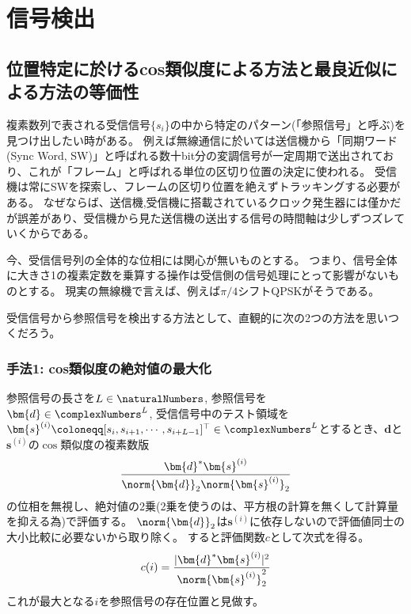 \chapter{信号検出}
    \section{位置特定に於けるcos類似度による方法と最良近似による方法の等価性}
        複素数列で表される受信信号$\{s_i\}$の中から特定のパターン(「参照信号」と呼ぶ)を見つけ出したい時がある。
        例えば無線通信に於いては送信機から「同期ワード (Sync Word, SW)」と呼ばれる数十bit分の変調信号が一定周期で送出されており、これが「フレーム」と呼ばれる単位の区切り位置の決定に使われる。
        受信機は常にSWを探索し、フレームの区切り位置を絶えずトラッキングする必要がある。
        なぜならば、送信機,受信機に搭載されているクロック発生器には僅かだが誤差があり、受信機から見た送信機の送出する信号の時間軸は少しずつズレていくからである。
        \par
        今、受信信号列の全体的な位相には関心が無いものとする。
        つまり、信号全体に大きさ1の複素定数を乗算する操作は受信側の信号処理にとって影響がないものとする。
        現実の無線機で言えば、例えば$\pi/4$シフトQPSKがそうである。
        \par
        受信信号から参照信号を検出する方法として、直観的に次の2つの方法を思いつくだろう。
        \subsection{手法1: cos類似度の絶対値の最大化}
            \label{手法1: cos類似度の絶対値の最大化}
            参照信号の長さを$L\in\naturalNumbers$, 参照信号を$\bm{d} \in \complexNumbers^L$, 受信信号中のテスト領域を$\bm{s}^{(i)} \coloneqq [s_i,s_{i+1},\cdots,s_{i+L-1}]^\top \in \complexNumbers^L$とするとき、$\bm{d}$と$\bm{s}^{(i)}$の$\cos$類似度の複素数版
            \[ \frac{\bm{d}^*\bm{s}^{(i)}}{\norm{\bm{d}}_2\norm{\bm{s}^{(i)}}_2} \]
            の位相を無視し、絶対値の2乗(2乗を使うのは、平方根の計算を無くして計算量を抑える為)で評価する。
            $\norm{\bm{d}}_2$は$\bm{s}^{(i)}$に依存しないので評価値同士の大小比較に必要ないから取り除く。
            すると評価関数$c$として次式を得る。
            \[ c(i) = \frac{|\bm{d}^*\bm{s}^{(i)}|^2}{\norm{\bm{s}^{(i)}}_2^2} \]
            これが最大となる$i$を参照信号の存在位置と見做す。
